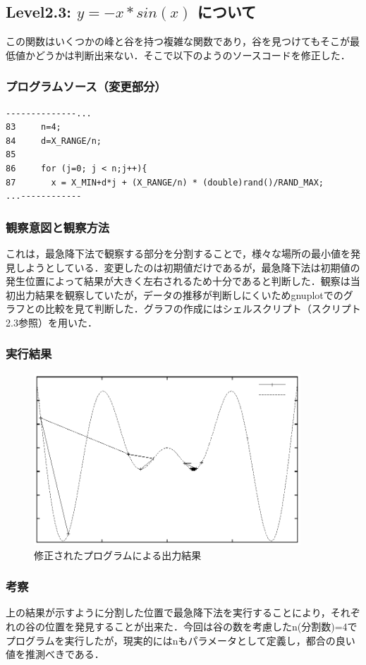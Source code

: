 \subsection{Level2.3: $y=-x*sin(x)$ について}
この関数はいくつかの峰と谷を持つ複雑な関数であり，谷を見つけてもそこが最低値かどうかは判断出来ない．そこで以下のようのソースコードを修正した．
\subsubsection{プログラムソース（変更部分）}
\begin{lstlisting}[caption=変更部分,label=fix01]
--------------...
83     n=4;
84     d=X_RANGE/n;
85
86     for (j=0; j < n;j++){
87       x = X_MIN+d*j + (X_RANGE/n) * (double)rand()/RAND_MAX;
...------------
\end{lstlisting}
\subsubsection{観察意図と観察方法}
 これは，最急降下法で観察する部分を分割することで，様々な場所の最小値を発見しようとしている．変更したのは初期値だけであるが，最急降下法は初期値の発生位置によって結果が大きく左右されるため十分であると判断した．観察は当初出力結果を観察していたが，データの推移が判断しにくいためgnuplotでのグラフとの比較を見て判断した．グラフの作成にはシェルスクリプト（スクリプト2.3参照）を用いた．
\subsubsection{実行結果}

\begin{figure}[htb]
 \begin{center}
 \includegraphics[width=10.0cm]{./level2/level2.3.eps}
  \caption{修正されたプログラムによる出力結果}
  \label{level2.3}
 \end{center}
\end{figure}
\subsubsection{考察}
上の結果が示すように分割した位置で最急降下法を実行することにより，それぞれの谷の位置を発見することが出来た．今回は谷の数を考慮したn(分割数)=4でプログラムを実行したが，現実的にはnもパラメータとして定義し，都合の良い値を推測べきである．

